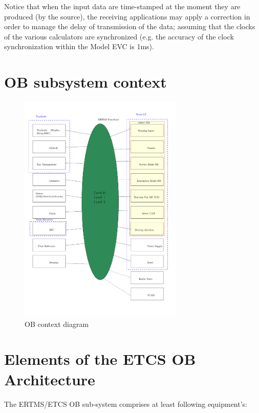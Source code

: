 \documentclass[oneside]{template/openetcs_report}
\begin{document}
Notice that when the input data are time-stamped at the moment they are produced (by the source), the receiving applications may apply a correction in order to manage the delay of transmission of the data; assuming that the clocks of the various calculators are synchronized (e.g. the accuracy of the clock synchronization within
the Model \gls{EVC} is {1ms}).

\chapter{OB subsystem context}
\begin{figure}[H]
	\center
	\includegraphics[width=0.7\textwidth]{API_sketch_v1.pdf}
	\caption{OB context diagram}\label{API_sketch}
\end{figure}


\chapter{Elements of the ETCS OB Architecture}

The ERTMS/ETCS OB sub-system comprises at least following equipment’s:
\end{document}

